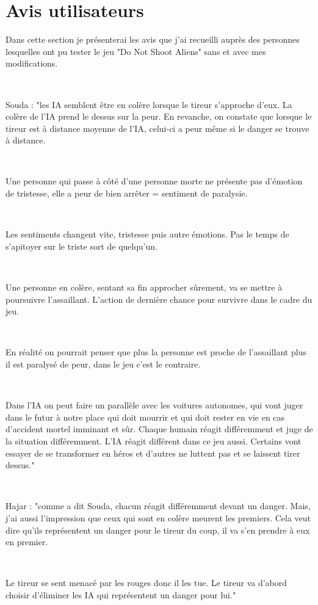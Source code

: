 \section{Avis utilisateurs}
Dans cette section je présenterai les avis que j'ai recueilli auprès des personnes lesquelles ont pu tester le jeu "Do Not Shoot Aliens" sans et avec mes modifications. 



~\par
Souda : "les IA semblent être en colère lorsque le tireur s'approche d'eux. La colère de l’IA prend le dessus sur la peur. En revanche, on constate que lorsque le tireur est à distance moyenne de l’IA, celui-ci a peur même si le danger se trouve à distance.

~\par
Une personne qui passe à côté d'une personne morte ne présente pas d'émotion de tristesse, elle a peur de bien arrêter  = sentiment de paralysie.

~\par
Les sentiments changent vite, tristesse puis autre émotions. Pas le temps de s'apitoyer sur le triste sort de quelqu'un.

~\par
Une personne en colère, sentant sa fin approcher sûrement, va se mettre à poursuivre l'assaillant. L'action de dernière chance pour survivre dans le cadre du jeu.

~\par
En réalité on pourrait penser que plus la personne est proche de l'assaillant plus il est paralysé de peur, dans le jeu c'est le contraire.

~\par
Dans l'IA on peut faire un parallèle avec les voitures autonomes, qui vont juger dans le futur à notre place qui doit mourrir et qui doit rester en vie en cas d'accident mortel imminant et sûr. Chaque humain réagit différemment et juge de la situation différemment. L'IA réagit différent dans ce jeu aussi. Certains vont essayer de se transformer en héros et d'autres ne luttent pas et se laissent tirer dessus."

~\par
Hajar : "comme a dit Souda, chacun réagit différemment devant un danger. Mais, j’ai aussi l’impression que ceux qui sont en colère meurent les premiers. Cela veut dire qu’ils représentent un danger pour le tireur du coup, il va s’en prendre à eux en premier.

~\par
Le tireur se sent menacé par les rouges donc il les tue. Le tireur va d’abord choisir d’éliminer les IA qui représentent un danger pour lui."




